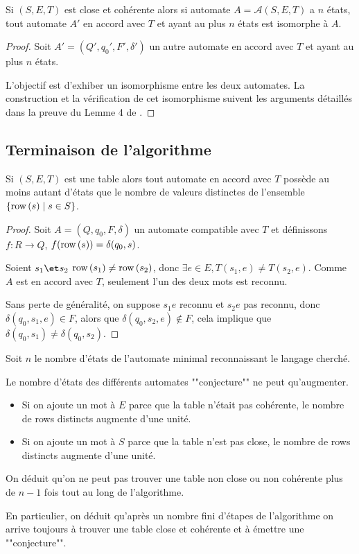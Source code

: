 \begin{lemma}
	Si $(S,E,T)$ est close et cohérente alors si automate $A = \mathcal A (S,E,T)$
	a $n$ états, tout automate $A'$ en accord avec $T$ et ayant au plus $n$ états est isomorphe à $A$.
\end{lemma}

\begin{proof}
	Soit $A' = (Q', q_0', F', \delta')$ un autre automate en accord avec $T$ et ayant au plus $n$ états.

	L'objectif est d'exhiber un isomorphisme entre les deux automates. La construction et la vérification
	de cet isomorphisme suivent les arguments détaillés dans la preuve du Lemme 4 de \cite{angluinLearning}.
\end{proof}

\subsection{Terminaison de l'algorithme}

\begin{lemma}
	Si $(S,E,T)$ est une table alors tout automate en accord avec $T$ possède au
	moins autant d'états que le nombre de valeurs distinctes de l'ensemble $\left\{\text{row}\left(s\right) \mid s \in S\right\}$.
\end{lemma}

\begin{proof}
	Soit $A = (Q,q_0,F,\delta)$ un automate compatible avec $T$ et définissons
	$f: R \to Q$, $f(\text{row}\left(s\right)) = \delta(q_0, s)$.

	Soient $s_1 \et s_2$ \tq $\text{row}\left(s_1\right) \neq \text{row}\left(s_2\right)$, donc $\exists e \in E, T(s_1,e) \neq T(s_2,e)$.
	Comme $A$ est en accord avec $T$, seulement l'un des deux mots est reconnu.

	Sans perte de généralité, on suppose $s_1e$ reconnu et $s_2e$ pas reconnu, donc
	$\delta (q_0, s_1, e) \in F$, alors que $\delta (q_0,s_2,e) \notin F$, cela implique que
	$\delta (q_0,s_1) \neq \delta (q_0,s_2)$.

\end{proof}

Soit $n$ le nombre d'états de l'automate minimal reconnaissant le langage cherché.

\begin{remarque}
	Le nombre d'états des différents automates ""conjecture"" ne peut qu'augmenter.
	\begin{itemize}
		\item Si on ajoute un mot à $E$ parce que la table n'était pas cohérente, le nombre de rows distincts augmente
		      d'une unité.
		\item Si on ajoute un mot à $S$ parce que la table n'est pas close, le nombre de rows distincts augmente d'une unité.
	\end{itemize}
	On déduit qu'on ne peut pas trouver une table non close ou non cohérente plus de $n-1$ fois tout au long de l'algorithme.

	En particulier, on déduit qu'après un nombre fini d'étapes de l'algorithme on arrive toujours à trouver
	une table close et cohérente et à émettre une ""conjecture"".
\end{remarque}


